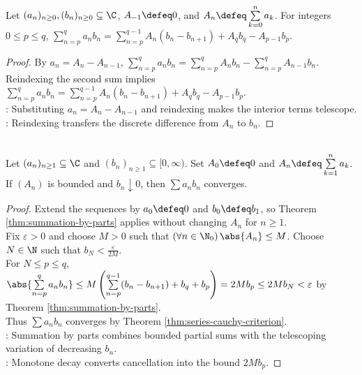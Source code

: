 \begin{theorem} \label{thm:summation-by-parts} \\
Let $(a_n)_{n\geq0},(b_n)_{n\geq0}\subseteq\C$, $A_{-1}\defeq0$, and $A_n\defeq\sum\limits_{k=0}^{n}a_k$. For integers $0\leq p\leq q$, $\sum\limits_{n=p}^{q}a_nb_n=\sum\limits_{n=p}^{q-1}A_n(b_n-b_{n+1})+A_qb_q-A_{p-1}b_p$.
\begin{proof}
By $a_n=A_n-A_{n-1}$, $\sum\limits_{n=p}^{q}a_nb_n=\sum\limits_{n=p}^{q}A_nb_n-\sum\limits_{n=p}^{q}A_{n-1}b_n$.\\
Reindexing the second sum implies $\sum\limits_{n=p}^{q}a_nb_n=\sum\limits_{n=p}^{q-1}A_n(b_n-b_{n+1})+A_qb_q-A_{p-1}b_p$.\\
: Substituting $a_n=A_n-A_{n-1}$ and reindexing makes the interior terms telescope.\\
: Reindexing transfers the discrete difference from $A_n$ to $b_n$.
\end{proof}
\end{theorem}

\begin{theorem} \label{thm:dirichlet-test-series} \\
Let $(a_n)_{n\geq1}\subseteq\C$ and $(b_n)_{n\geq1}\subseteq[0,\infty)$. Set $A_0\defeq0$ and $A_n\defeq\sum\limits_{k=1}^{n}a_k$. If $(A_n)$ is bounded and $b_n\downarrow0$, then $\sum a_nb_n$ converges.
\begin{proof}
Extend the sequences by $a_0\defeq0$ and $b_0\defeq b_1$, so Theorem \ref{thm:summation-by-parts} applies without changing $A_n$ for $n\geq1$.\\
Fix $\varepsilon>0$ and choose $M>0$ such that $(\forall n\in\N_0)\,\abs{A_n}\leq M$. Choose $N\in\N$ such that $b_N<\frac{\varepsilon}{2M}$.\\
For $N\leq p\leq q$, $\abs{\sum\limits_{n=p}^{q}a_nb_n}\leq M\left(\sum\limits_{n=p}^{q-1}(b_n-b_{n+1})+b_q+b_p\right)=2Mb_p\leq2Mb_N<\varepsilon$ by Theorem \ref{thm:summation-by-parts}.\\
Thus $\sum a_nb_n$ converges by Theorem \ref{thm:series-cauchy-criterion}.\\
: Summation by parts combines bounded partial sums with the telescoping variation of decreasing $b_n$.\\
: Monotone decay converts cancellation into the bound $2Mb_p$.
\end{proof}
\end{theorem}

